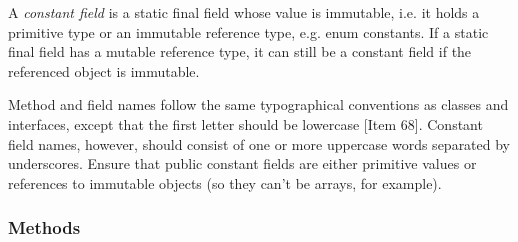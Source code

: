 \documentclass[table, xcdraw]{article}%
\begin{document}
A \emph{constant field} is a static final field whose value is immutable, i.e. it holds a primitive type or an immutable reference type, e.g. enum constants. If a static final field has a mutable reference type, it can still be a constant field if the referenced object is immutable.

Method and field names follow the same typographical conventions as classes and interfaces, except that the first letter should be lowercase [Item 68]. Constant field names, however, should consist of one or more uppercase words separated by underscores. Ensure that public constant fields are either primitive values or references to immutable objects (so they can't be arrays, for example).

\subsubsection{Methods}
\end{document}
